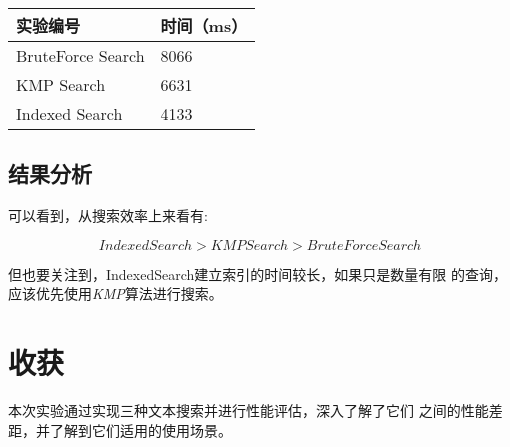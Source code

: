 \documentclass[12pt,a4paper]{ctexart}
\begin{document}
\begin{table}[htbp]
    \centering
    \begin{tabular}{|l|l|}
        \hline
        实验编号          & 时间（ms） \\ \hline
        BruteForce Search & 8066       \\ \hline
        KMP Search        & 6631       \\ \hline
        Indexed Search    & 4133       \\ \hline
    \end{tabular}
\end{table}
\subsection{结果分析}

可以看到，从搜索效率上来看有:

\begin{equation}
    \nonumber
    IndexedSearch > KMPSearch > BruteForce Search
\end{equation}

但也要关注到，IndexedSearch建立索引的时间较长，如果只是数量有限
的查询，应该优先使用\textit{KMP}算法进行搜索。


\section{收获}
本次实验通过实现三种文本搜索并进行性能评估，深入了解了它们
之间的性能差距，并了解到它们适用的使用场景。
\end{document}

